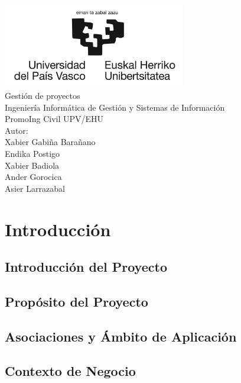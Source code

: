 \documentclass{report}
\begin{document}
    \begin{titlepage}
        \centering
        \includegraphics[width=0.6\textwidth]{./img/logo.jpg}\\
        \vspace{1cm}
        \LARGE Gestión de proyectos\\
        \vspace{0.5cm}
        \Large Ingeniería Informática de Gestión y Sistemas de Información\\
        \vspace{3cm}
        \Huge PromoIng Civil UPV/EHU\\
        \vspace{2.5cm}
        \Large Autor:\\
        \vspace{0.2cm}
        \large Xabier Gabiña Barañano\\
        \large Endika Postigo\\
        \large Xabier Badiola\\
        \large Ander Gorocica\\
        \large Asier Larrazabal\\
    \end{titlepage}
    \tableofcontents
    \chapter{Introducción}
        \section{Introducción del Proyecto}
        \section{Propósito del Proyecto}
        \section{Asociaciones y Ámbito de Aplicación}
        \section{Contexto de Negocio}
\end{document}
